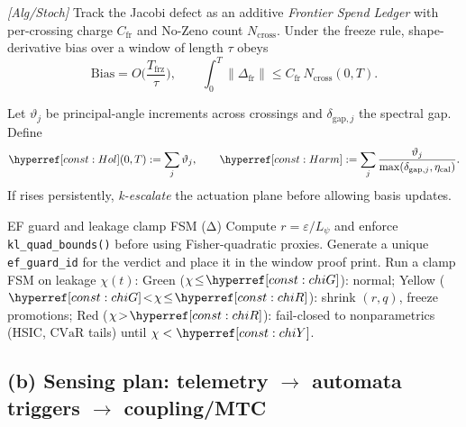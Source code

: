 \begin{lemma}\label{lem:ledger-freeze}
\emph{[\textup{Alg/Stoch}]}
Track the Jacobi defect as an additive \emph{Frontier Spend Ledger} with per-crossing charge $C_{\mathrm{fr}}$ and No-Zeno count $N_{\mathrm{cross}}$. Under the freeze rule, shape-derivative bias over a window of length $\tau$ obeys
\[
\mathrm{Bias}=O\!\Big(\frac{T_{\mathrm{frz}}}{\tau}\Big),\qquad
\int_0^T\!\|\Delta_{\mathrm{fr}}\|\le C_{\mathrm{fr}}\,N_{\mathrm{cross}}(0,T).
\]
\end{lemma}

\begin{definition}\label{def:hol-harm}
Let $\vartheta_j$ be principal-angle increments across crossings and $\delta_{\mathrm{gap},j}$ the spectral gap. Define
\[
\constref{Hol}(0,T):=\sum_j \vartheta_j,\qquad
\constref{Harm}:=\sum_j \frac{\vartheta_j}{\max(\delta_{\mathrm{gap},j},\eta_{\mathrm{cal}})}.
\]
If  rises persistently, \emph{k-escalate} the actuation plane before allowing basis updates.
\end{definition}

\begin{rulex}{EF guard and leakage clamp FSM (Δ)}\label{rule:ef-clamp}
Compute $r=\varepsilon/L_\psi$ and enforce \texttt{kl\_quad\_bounds()} before using Fisher-quadratic proxies. Generate a unique \texttt{ef\_guard\_id} for the verdict and place it in the window proof print. Run a clamp FSM on leakage $\chi(t)$:
Green ($\chi\!\le\!\constref{chiG}$): normal;\quad
Yellow ($\constref{chiG}\!<\!\chi\!\le\!\constref{chiR}$): shrink $(r,q)$, freeze promotions;\quad
Red ($\chi\!>\!\constref{chiR}$): fail-closed to nonparametrics (HSIC, $\mathrm{CVaR}$ tails) until $\chi<\constref{chiY}$.
\end{rulex}

\subsection{(b) Sensing plan: telemetry $\rightarrow$ automata triggers $\rightarrow$ coupling/MTC}\label{subsec:ops-sense}
\emph{}

